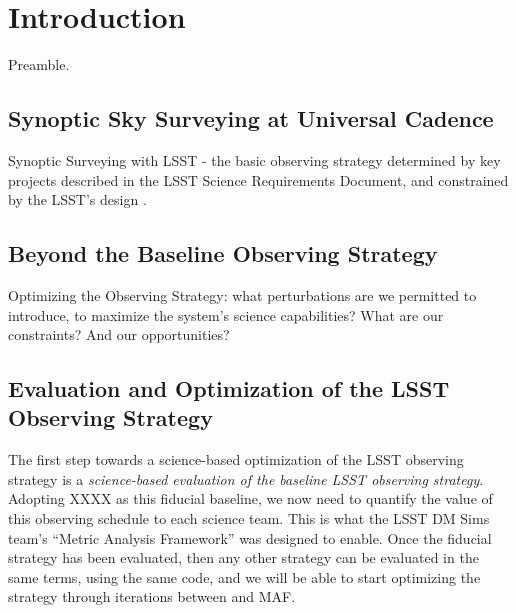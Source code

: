 
\chapter[Introduction]{Introduction}
\def\chpname{intro}\label{chp:\chpname}


Preamble.


\section{Synoptic Sky Surveying at Universal Cadence}
\def\secname{intro:baseline}\label{sec:\secname}

Synoptic Surveying with LSST - the basic observing strategy determined
by key projects described in the LSST Science Requirements Document,
and constrained by the LSST's design \citep{IvezicEtal2008}.


\section{Beyond the Baseline Observing Strategy}
\def\secname{intro:baseline}\label{sec:\secname}

Optimizing the Observing Strategy: what perturbations are we
permitted to introduce, to maximize the system's science capabilities?
What are our constraints? And our opportunities?


\section{Evaluation and Optimization of the LSST Observing Strategy}
\def\secname{intro:evaluation}\label{sec:\secname}

The first step towards a science-based optimization of the LSST
observing strategy is a {\it science-based evaluation of the baseline
LSST observing strategy}. Adopting XXXX as this fiducial baseline, we
now need to quantify the value of this observing schedule to each
science team. This is what the LSST DM Sims team's ``Metric Analysis
Framework''  was designed to enable. Once the fiducial strategy has
been evaluated, then any other strategy can be evaluated in the same
terms, using the same code, and we will be able to start optimizing
the strategy through iterations between \OpSim and MAF.

